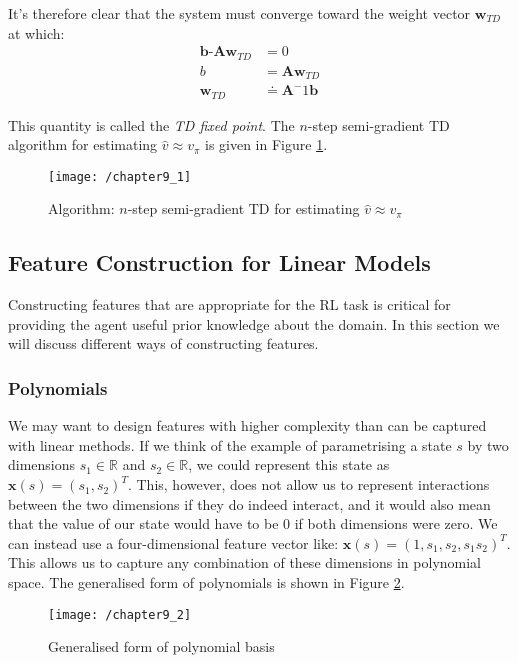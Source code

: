 It's therefore clear that the system must converge toward the weight vector $\textbf{w}_{TD}$ at which:
\begin{align}
\textbf{b-Aw}_{TD} &= 0 \\
b &= \textbf{Aw}_{TD} \\
\textbf{w}_{TD} &\doteq \textbf{A}^-1\textbf{b}
\end{align}

This quantity is called the \textit{TD fixed point}. The $n$-step semi-gradient TD algorithm for estimating $\hat{v} \approx v_\pi$ is given in Figure \ref{fig: n-step algo}.

\begin{figure}[h!]
	\centering
	\texttt{[image: /chapter9\_1]}
	\caption{Algorithm: $n$-step semi-gradient TD for estimating $\hat{v} \approx v_\pi$}
	\label{fig: n-step algo}
\end{figure}

\subsection{Feature Construction for Linear Models}
Constructing features that are appropriate for the RL task is critical for providing the agent useful prior knowledge about the domain. In this section we will discuss different ways of constructing features.

\subsubsection{Polynomials}
We may want to design features with higher complexity than can be captured with linear methods. If we think of the example of parametrising a state $s$ by two dimensions $s_1 \in \mathbb{R}$ and $s_2 \in \mathbb{R}$, we could represent this state as $\textbf{x}(s) = (s_1, s_2)^T$. This, however, does not allow us to represent interactions between the two dimensions if they do indeed interact, and it would also mean that the value of our state would have to be 0 if both dimensions were zero. We can instead use a four-dimensional feature vector like: $\textbf{x}(s) = (1, s_1, s_2, s_1s_2)^T$. This allows us to capture any combination of these dimensions in polynomial space. The generalised form of polynomials is shown in Figure \ref{fig: poly}.

\begin{figure}[h!]
	\centering
	\texttt{[image: /chapter9\_2]}
	\caption{Generalised form of polynomial basis}
	\label{fig: poly}
\end{figure}


